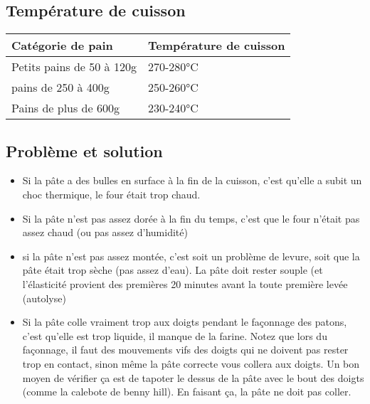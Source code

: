 \documentclass[a4paper,twoside,openright]{report}
\begin{document}
\subsection{Température de cuisson}
\begin{center}
\begin{tabular}{|l|l|}\hline
Catégorie de pain & Température de cuisson \\\hline
Petits pains de 50 à 120g & 270-280°C \\\hline
pains de 250 à 400g & 250-260°C \\\hline
Pains de plus de 600g & 230-240°C \\\hline
\end{tabular}\end{center}

\subsection{Problème et solution}
\begin{itemize}
\item Si la pâte a des bulles en surface à la fin de la cuisson, c'est qu'elle a subit un choc thermique, le four était trop 
chaud. 
\item Si la pâte n'est pas assez dorée à la fin du temps, c'est que le four n'était pas assez chaud (ou pas assez d'humidité)
\item si la pâte n'est pas assez montée, c'est soit un problème de levure, soit que la pâte était trop sèche (pas assez d'eau). 
La pâte doit rester souple (et l'élasticité provient des premières 20 minutes avant la toute première levée (autolyse)
\item Si la pâte colle vraiment trop aux doigts pendant le façonnage des patons, c'est qu'elle est trop liquide, il manque de 
la farine. Notez que lors du façonnage, il faut des mouvements vifs des doigts qui ne doivent pas rester trop en contact, sinon 
même la pâte correcte vous collera aux doigts. Un bon moyen de vérifier ça est de tapoter le dessus de la pâte avec le bout des 
doigts (comme la calebote de benny hill). En faisant ça, la pâte ne doit pas coller. 
\end{itemize}
\end{document}
